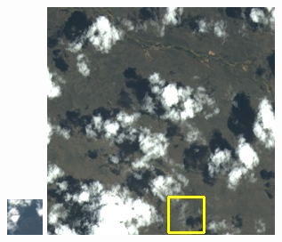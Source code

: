 \documentclass[UTF8]{ctexart}
\begin{document}
\begin{figure}[H]
{\begin{minipage}[b]{0.15\linewidth}
            \includegraphics[width=1\linewidth]{../log/spoon2/cut/tmp_cut_LC80350192014190LGN00_06561_color.jpg}\vspace{4pt}
            \includegraphics[width=1\linewidth]{../log/spoon2/cut/LC80980712014024LGN00_15443_color.jpg}\vspace{4pt}

\end{minipage}}
\end{figure}
\end{document}
